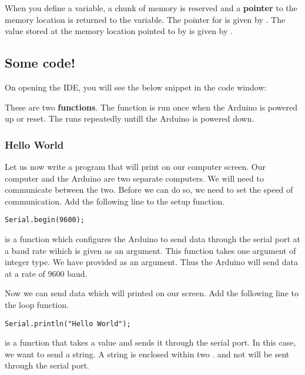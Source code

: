 \documentclass{article}
\begin{document}

			When you define a variable, a chunk of memory is reserved and a \textbf{pointer} to the memory location is returned to the variable. The pointer for  is given by . The value stored at the memory location pointed to by  is given by .

	\subsection{Some code!}

		On opening the IDE, you will see the below snippet in the code window:

		

		These are two \textbf{functions}. The  function is run once when the Arduino is powered up or reset. The  runs repeatedly untill the Arduino is powered down.

		\subsubsection{Hello World}
			Let us now write a program that will print  on our computer screen. Our computer and the Arduino are two separate computers. We will need to communicate between the two. Before we can do so, we need to set the speed of communication. Add the following line to the setup function.

			\begin{lstlisting}[firstnumber = 3]
			Serial.begin(9600);
			\end{lstlisting}

			 is a function which configures the Arduino to send data through the serial port at a baud rate wihich is given as an argument. This function takes one argument of integer type. We have provided  as an argument. Thus the Arduino will send data at a rate of 9600 baud.

			Now we can send data which will printed on our screen. Add the following line to the loop function.

			\begin{lstlisting}[firstnumber = 8]
			Serial.println("Hello World");
			\end{lstlisting}

			 is a function that takes a value and sends it through the serial port. In this case, we want to send a string. A string is enclosed within two .  and not  will be sent through the serial port.
\end{document}
